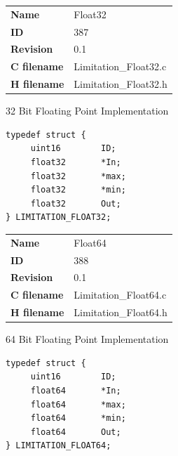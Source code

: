 \ifdefined \AddTestReports
{}
\fi
{}
\nopagebreak[0]
\begin{tabular}{l l}
\textbf{Name} & Float32 \tabularnewline
\textbf{ID} & 387 \tabularnewline
\textbf{Revision} & 0.1 \tabularnewline
\textbf{C filename} & Limitation\_Float32.c \tabularnewline
\textbf{H filename} & Limitation\_Float32.h \tabularnewline
\end{tabular}
\vspace{1ex}

32 Bit Floating Point Implementation

\begin{lstlisting}
typedef struct {
     uint16        ID;
     float32       *In;
     float32       *max;
     float32       *min;
     float32       Out;
} LIMITATION_FLOAT32;
\end{lstlisting}

\ifdefined \AddTestReports
{}
\fi
{}
\nopagebreak[0]
\begin{tabular}{l l}
\textbf{Name} & Float64 \tabularnewline
\textbf{ID} & 388 \tabularnewline
\textbf{Revision} & 0.1 \tabularnewline
\textbf{C filename} & Limitation\_Float64.c \tabularnewline
\textbf{H filename} & Limitation\_Float64.h \tabularnewline
\end{tabular}
\vspace{1ex}

64 Bit Floating Point Implementation

\begin{lstlisting}
typedef struct {
     uint16        ID;
     float64       *In;
     float64       *max;
     float64       *min;
     float64       Out;
} LIMITATION_FLOAT64;
\end{lstlisting}

\ifdefined \AddTestReports
{}
\fi
